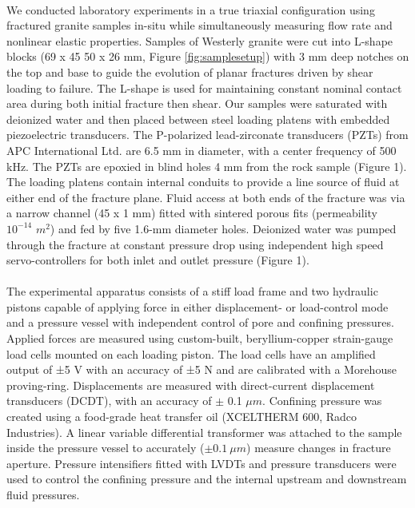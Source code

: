 \documentclass[letterpaper,10pt]{article}
\begin{document}
\paragraph{} We conducted laboratory experiments in a true triaxial configuration using fractured granite samples in-situ while simultaneously measuring flow rate and nonlinear elastic properties. Samples of Westerly granite were cut  into L-shape blocks (69 x 45 50 x 26 mm, Figure \ref{fig:samplesetup}) with 3 mm deep notches on the top and base to guide the evolution of planar fractures driven by shear loading to failure. The L-shape is used for maintaining constant nominal contact area during both initial fracture then shear. Our samples were saturated with deionized water and then placed between steel loading platens  with  embedded piezoelectric transducers. The P-polarized lead-zirconate transducers (PZTs) from APC International Ltd. are 6.5 mm in diameter, with a center frequency of 500 kHz. The PZTs are epoxied in blind holes 4 mm from the rock sample (Figure 1). The loading platens contain internal conduits to provide a line source of fluid at either end of the fracture plane. Fluid access at both ends of the fracture was via a narrow channel (45 x 1 mm) fitted with sintered porous fits (permeability ~ $10^{-14}$ $m^2$) and fed by five 1.6-mm diameter holes.  Deionized water was pumped through the fracture at constant pressure drop using independent high speed servo-controllers for both inlet and outlet pressure (Figure 1).

\paragraph{} The experimental apparatus consists of a stiff load frame and two hydraulic pistons capable of applying force in either displacement- or load-control mode and a pressure vessel with independent control of pore and confining pressures. Applied forces are measured using custom-built, beryllium-copper strain-gauge load cells mounted on each loading piston. The load cells have an amplified output of ±5 V with an accuracy of ±5 N and are calibrated with a Morehouse proving-ring. Displacements are measured with direct-current displacement transducers (DCDT), with an accuracy of $\pm$ 0.1 $\mu m$. Confining pressure was created using a food-grade heat transfer oil (XCELTHERM 600, Radco Industries). A linear variable differential transformer was attached to the sample inside the pressure vessel to accurately ($\pm 0.1\ \mu m$) measure changes in fracture aperture. Pressure intensifiers fitted with LVDTs and pressure transducers were used to control the confining pressure and the internal upstream and downstream fluid pressures.
\end{document}
